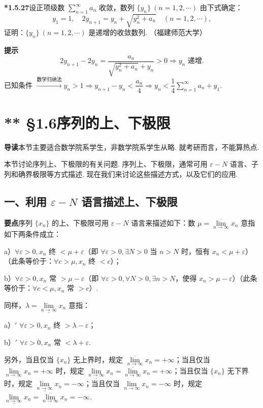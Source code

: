 \documentclass[UTF8, 12pt, fontset=fandol, oneside]{ctexart}
\begin{document}
\noindent\textbf{*1.5.27}\quad 设正项级数 $\sum\limits_{n=1}^{\infty}a_n$ 收敛，数列 $\{y_n\}\ (n=1,2,\cdots)$ 由下式确定：
\[
  y_1=1,\quad 2y_{n+1}=y_n+\sqrt{y_n^2+a_n}\quad (n=1,2,\cdots),
\]
证明：$\{y_n\}\ (n=1,2,\cdots)$ 是递增的收敛数列. （福建师范大学）

\noindent\textbf{提示}\quad
\[
  2y_{n+1}-2y_n=\frac{a_n}{\sqrt{y_n^2+a_n}+y_n}>0\Rightarrow y_n\text{ 递增}.
\]
已知条件 $\xrightarrow{\text{数学归纳法}} y_n>1\Rightarrow y_{n+1}-y_n<\dfrac{a_n}{4}\Rightarrow y_n<\dfrac14\sum\limits_{n=1}^{\infty}a_n+y_1$.

\section*{** §1.6\quad 序列的上、下极限}

\noindent\textbf{导读}\quad 本节主要适合数学院系学生，非数学院系学生从略. 就考研而言，不能算热点.

本节讨论序列上、下极限的有关问题. 序列上、下极限，通常可用 $\varepsilon-N$ 语言、子列和确界极限等方式描述. 现在我们来讨论这些描述方式，以及它们的应用.

\subsection*{一、利用 $\varepsilon-N$ 语言描述上、下极限}

\noindent\textbf{要点}\quad 序列 $\{x_n\}$ 的上、下极限可用 $\varepsilon-N$ 语言来描述如下：数 $\mu=\overline{\lim\limits_{n\to\infty}}x_n$ 意指如下两条件成立：

a）$\forall \varepsilon>0,x_n$ 终 $<\mu+\varepsilon$（即 $\forall \varepsilon>0,\exists N>0$ 当 $n>N$ 时，恒有 $x_n<\mu+\varepsilon$）（此条等价于：$\forall c>\mu,x_n$ 终 $<c$）；

b）$\forall \varepsilon>0,x_n$ 常 $>\mu-\varepsilon$（即 $\forall \varepsilon>0,\forall N>0,\exists n>N$，使得 $x_n>\mu-\varepsilon$）（此条等价于：$\forall c<\mu,x_n$ 常 $>c$）.

同样，$\lambda=\underline{\lim\limits_{n\to\infty}}x_n$ 意指：

a）$'$ $\forall \varepsilon>0,x_n$ 终 $>\lambda-\varepsilon$；

b）$'$ $\forall \varepsilon>0,x_n$ 常 $<\lambda+\varepsilon$.

另外，当且仅当 $\{x_n\}$ 无上界时，规定 $\overline{\lim\limits_{n\to\infty}}x_n=+\infty$；当且仅当 $\lim\limits_{n\to\infty}x_n=+\infty$ 时，规定 $\underline{\lim\limits_{n\to\infty}}x_n=\overline{\lim\limits_{n\to\infty}}x_n=+\infty$；当且仅当 $\{x_n\}$ 无下界时，规定 $\underline{\lim\limits_{n\to\infty}}x_n=-\infty$；当且仅当 $\lim\limits_{n\to\infty}x_n=-\infty$ 时，规定 $\underline{\lim\limits_{n\to\infty}}x_n=\overline{\lim\limits_{n\to\infty}}x_n=-\infty$.
\end{document}
